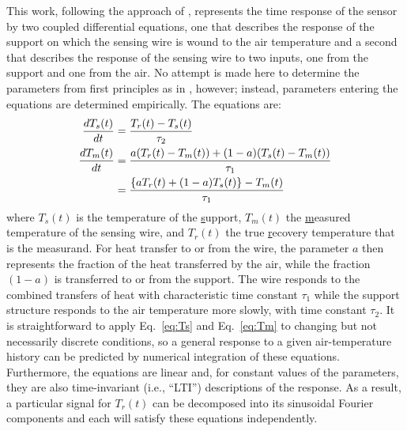 \documentclass[amt, manuscript]{copernicus}
\begin{document}
This work, following the approach of \citet{PayneEtAl1994}, represents
the time response of the sensor by two coupled differential equations,
one that describes the response of the support on which the sensing wire
is wound to the air temperature and a second that describes the response
of the sensing wire to two inputs, one from the support and one from the
air. No attempt is made here to determine the parameters from first
principles as in \citet{PayneEtAl1994}, however; instead, parameters
entering the equations are determined empirically. The equations are:
\begin{align}
\frac{dT_{s}(t)}{dt} & =\frac{T_{r}(t)-T_{s}(t)}{\tau_{2}}{\label{eq:Ts}} \\
\frac{dT_{m}(t)}{dt} & =\frac{a(T_{r}(t)-T_{m}(t))+(1-a)(T_{s}(t)-T_{m}(t))}{\tau_{1}}\nonumber\\
& = \frac{\left\{ aT_{r}(t)+(1-a)T_{s}(t)\right\} -T_{m}(t)}{\tau_{1}}{\label{eq:Tm}}
\end{align} where \(T_{s}(t)\) is the temperature of the
\uline{s}upport, \(T_{m}(t)\) the \uline{m}easured temperature of the
sensing wire, and \(T_{r}(t)\) the true \uline{r}ecovery temperature
that is the measurand. For heat transfer to or from the wire, the
parameter \(a\) then represents the fraction of the heat transferred by
the air, while the fraction \((1-a)\) is transferred to or from the
support. The wire responds to the combined transfers of heat with
characteristic time constant \(\tau_{1}\) while the support structure
responds to the air temperature more slowly, with time constant
\(\tau_{2}\). It is straightforward to apply Eq.~\eqref{eq:Ts} and
Eq.~\eqref{eq:Tm} to changing but not necessarily discrete conditions,
so a general response to a given air-temperature history can be
predicted by numerical integration of these equations. Furthermore, the
equations are linear and, for constant values of the parameters, they
are also time-invariant (i.e., ``LTI'') descriptions of the response. As
a result, a particular signal for \(T_{r}(t)\) can be decomposed into
its sinusoidal Fourier components and each will satisfy these equations
independently.
\end{document}
